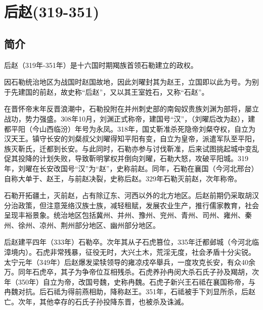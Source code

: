

\section{后赵\tiny(319-351)}

\subsection{简介}

后赵（319年-351年）是十六国时期羯族首领石勒建立的政权。

因石勒统治地区为战国时赵国故地，因此刘曜封其为赵王，立国即以此为号。为别于先建国的前赵，故史称“后赵”，又以其王室姓石，又称“石赵”。

在晋怀帝末年反晋浪潮中，石勒投附在并州刺史部的南匈奴贵族刘渊为部将，屡立战功，势力强盛。308年10月，刘渊正式称帝，建国号“汉”，（刘曜后改为赵），建都平阳（今山西临汾）年号为永凤。318年，国丈靳准杀死隐帝刘粲夺权，自立为汉天王。镇守长安的刘粲叔父刘曜得知平阳有变，自立为皇帝，派遣军队至平阳，族灭靳氏，迁都到长安。与此同时，石勒亦参与讨伐靳准，后来试图挑起城中变乱促其投降的计划失败，导致靳明掌权并倒向刘曜，石勒大怒，攻破平阳城。319年，刘曜在长安改国号“汉”为“赵”，史称前赵。同年，石勒在襄国（今河北邢台）自称大单于、赵王，与前赵决裂，史称后赵。329年石勒灭前赵，次年称帝。

石勒开拓疆土，灭前赵，占有除辽东、河西以外的北方地区。后赵前期仍采取胡汉分治政策，但注意笼络汉族士族，减轻租赋，发展农业生产，推行儒家教育，社会呈现丰裕景象。统治地区包括冀州、并州、豫州、兖州、青州、司州、雍州、秦州、徐州、凉州、荆州部分地区、幽州部分地区。

后赵建平四年（333年）石勒卒。次年其从子石虎篡位，335年迁都邺城（今河北临漳境内）。石虎非常残暴，征役无时，大兴土木，荒淫无度，社会矛盾十分尖锐。太宁元年（349年）后赵爆发梁犊领导的雍凉戍卒舉兵，一度攻克长安，有众40余万。同年石虎卒，其子为争帝位互相残杀。石虎养孙冉闵大杀石氏子孙及羯胡，次年（350年）自立为帝，改国号魏，史称冉魏。石虎子新兴王石祗在襄国称帝，与冉魏对抗。后石祗为得前燕相助，降称赵王。351年，石祗被手下刘显所杀，后赵亡。次年，其他幸存的石氏子孙投降东晋，也被杀及诛滅。








